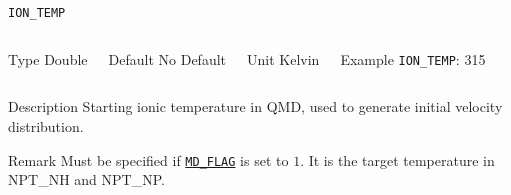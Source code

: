 \begin{frame}[allowframebreaks]{\texttt{ION\_TEMP}} \label{ION_TEMP}
\vspace*{-12pt}
\begin{columns}
\begin{block}{Type}
Double
\end{block}

\begin{block}{Default}
No Default
\end{block}

\begin{block}{Unit}
Kelvin
\end{block}

\begin{block}{Example}
\texttt{ION\_TEMP}: 315
\end{block}
\end{columns}

\begin{block}{Description}
Starting ionic temperature in QMD, used to generate initial velocity distribution.
\end{block}

\begin{block}{Remark}
Must be specified if \hyperlink{MD_FLAG}{\texttt{MD\_FLAG}} is set to $1$. It is the target temperature in NPT\_NH and NPT\_NP.
\end{block}

\end{frame}



